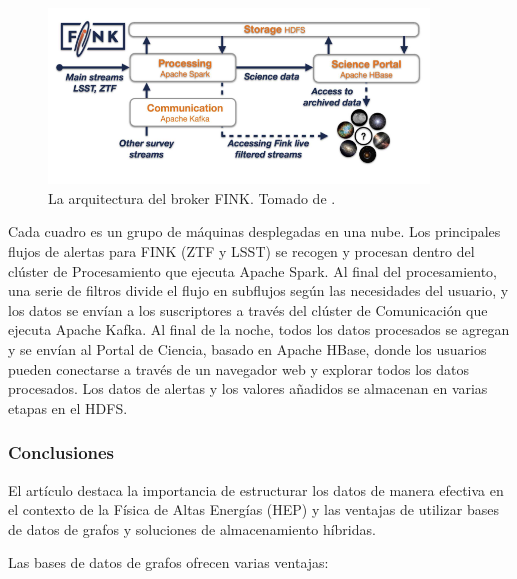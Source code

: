 \documentclass[pdflatex,sn-mathphys-num]{sn-jnl}
\theoremstyle{thmstyleone}%
\theoremstyle{thmstyletwo}%
\theoremstyle{thmstylethree}%
\begin{document}
\begin{figure}[H]
    \centering
    \includegraphics[width=0.9\textwidth]{figs/multidb-2.png}
    \caption{La arquitectura del broker FINK. Tomado de \cite{10.1093/mnras/staa3602}.}
    \label{multidb-2}
\end{figure}

Cada cuadro es un grupo de máquinas desplegadas en una nube. Los principales flujos de alertas para FINK (ZTF y LSST) se recogen y procesan dentro del clúster de Procesamiento que ejecuta Apache Spark. Al final del procesamiento, una serie de filtros divide el flujo en subflujos según las necesidades del usuario, y los datos se envían a los suscriptores a través del clúster de Comunicación que ejecuta Apache Kafka. Al final de la noche, todos los datos procesados se agregan y se envían al Portal de Ciencia, basado en Apache HBase, donde los usuarios pueden conectarse a través de un navegador web y explorar todos los datos procesados. Los datos de alertas y los valores añadidos se almacenan en varias etapas en el HDFS\cite{10.1093/mnras/staa3602}.

\subsubsection{Conclusiones}

El artículo destaca la importancia de estructurar los datos de manera efectiva en el contexto de la Física de Altas Energías (HEP) y las ventajas de utilizar bases de datos de grafos y soluciones de almacenamiento híbridas.

Las bases de datos de grafos ofrecen varias ventajas:
\end{document}

